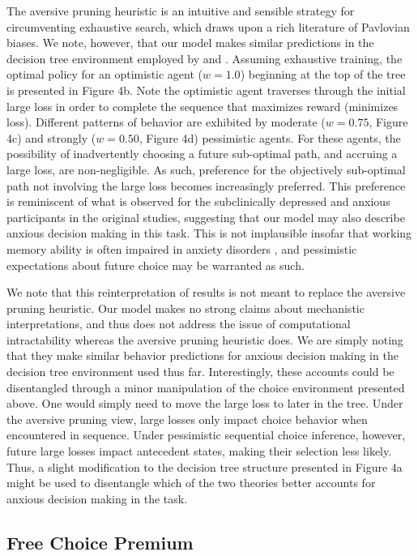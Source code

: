 \documentclass[11pt]{article} %
\begin{document}
The aversive pruning heuristic is an intuitive and sensible strategy for circumventing exhaustive search, which draws upon a rich literature of Pavlovian biases. We note, however, that our model makes similar predictions in the decision tree environment employed by \cite{Huys2012} and \cite{Lally2017}. Assuming exhaustive training, the optimal policy for an optimistic agent ($w=1.0$) beginning at the top of the tree is presented in Figure 4b. Note the optimistic agent traverses through the initial large loss in order to complete the sequence that maximizes reward (minimizes loss). Different patterns of behavior are exhibited by moderate ($w=0.75$, Figure 4c) and strongly ($w=0.50$, Figure 4d) pessimistic agents. For these agents, the possibility of inadvertently choosing a future sub-optimal path, and accruing a large loss, are non-negligible. As such, preference for the objectively sub-optimal path not involving the large loss becomes increasingly preferred. This preference is reminiscent of what is observed for the subclinically depressed and anxious participants in the original studies, suggesting that our model may also describe anxious decision making in this task. This is not implausible insofar that working memory ability is often impaired in anxiety disorders \citep{Moran2016}, and pessimistic expectations about future choice may be warranted as such. 

We note that this reinterpretation of results is not meant to replace the aversive pruning heuristic. Our model makes no strong claims about mechanistic interpretations, and thus does not address the issue of computational intractability whereas the aversive pruning heuristic does. We are simply noting that they make similar behavior predictions for anxious decision making in the decision tree environment used thus far. Interestingly, these accounts could be disentangled through a minor manipulation of the choice environment presented above. One would simply need to move the large loss to later in the tree. Under the aversive pruning view, large losses only impact choice behavior when encountered in sequence. Under pessimistic sequential choice inference, however, future large losses impact antecedent states, making their selection less likely. Thus, a slight modification to the decision tree structure presented in Figure 4a might be used to disentangle which of the two theories better accounts for anxious decision making in the task.

\subsection{Free Choice Premium}
\end{document}

